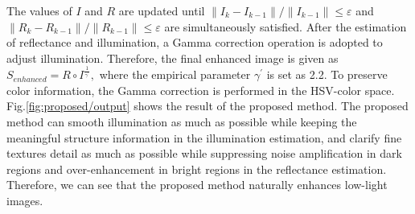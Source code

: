 The values of $I$ and $R$ are updated until $\|I_{k}-I_{k-1}\|/\|I_{k-1}\| \leq \varepsilon$ and $\|R_{k}-R_{k-1}\|/\|R_{k-1}\| \leq \varepsilon$ are simultaneously satisfied. After the estimation of  reflectance and illumination, a Gamma correction operation is adopted to adjust illumination. Therefore, the final enhanced image is given as $ S_{enhanced} = R \circ I^{\frac{1}{\gamma^{'}}}, \label{eq_final}$ where the empirical parameter $\gamma^{'}$ is set as 2.2. To preserve color information, the Gamma correction is performed in the HSV-color space.
Fig.\ref{fig:proposed/output} shows the result of the proposed method. The proposed method can smooth illumination as much as possible while keeping the meaningful structure information in the illumination estimation, and clarify fine textures detail as much as possible while suppressing noise amplification in dark regions and over-enhancement in bright regions in the reflectance estimation. Therefore, we can see that the proposed method naturally enhances low-light images.
